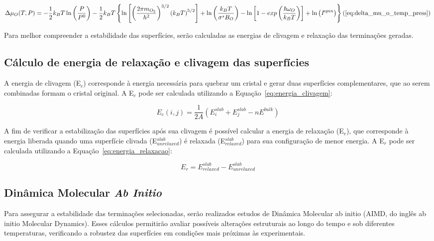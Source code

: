 \begin{dmath*}
\Delta \mu_{O}(T,P) = -\frac{1}{2}k_BT \ln \left(\frac{P}{P^0}\right) -\frac{1}{2}k_BT \left\{\ln \left[\left( \frac{2\pi m_{O_2}}{h^2} \right)^{3/2} \left(k_BT \right)^{5/2}\right] + \ln \left(\frac{k_BT}{\sigma^s B_O}\right) - \ln \left[1  - exp\left(\frac{\hbar \omega_O}{k_B T}\right)\right] + \ln \left(\textit{I}^{spin} \right)\right\} \\
\hfill (\ref{eq:delta_mu_o_temp_press})
\end{dmath*}

Para melhor compreender a estabilidade das superfícies, serão calculadas as energias de clivagem e relaxação das terminações geradas.

\subsection{Cálculo de energia de relaxação e clivagem das superfícies}
A energia de clivagem (E$_c$) corresponde à energia necessária para quebrar um cristal e gerar duas superfícies complementares, que ao serem combinadas formam o cristal original. A E$_c$ pode ser calculada utilizando a Equação~\ref{eq:energia_clivagem}:

\begin{equation}
E_{c}(i,j) = \frac{1}{2A} \left( E^{slab}_i + E^{slab}_j - nE^{bulk} \right)
\label{eq:energia_clivagem}
\end{equation}

\vspace{1em}

A fim de verificar a estabilização das superfícies após sua clivagem é possível calcular a energia de relaxação (E$_r$), que corresponde à energia liberada quando uma superfície clivada (E$_{unrelaxed}^{slab}$) é relaxada (E$_{relaxed}^{slab}$) para sua configuração de menor energia. A E$_r$ pode ser calculada utilizando a Equação~\ref{eq:energia_relaxacao}:

\begin{equation}
E_{r} = E_{relaxed}^{slab} - E_{unrelaxed}^{slab}
\label{eq:energia_relaxacao}
\end{equation}

\subsection{Dinâmica Molecular \textit{Ab Initio}}
Para assegurar a estabilidade das terminações selecionadas, serão 
realizados estudos de Dinâmica Molecular ab initio (AIMD, do inglês ab initio Molecular Dynamics). Esses cálculos permitirão avaliar possíveis alterações estruturais ao longo do tempo e sob diferentes temperaturas, verificando a robustez das superfícies em condições mais próximas às experimentais.


